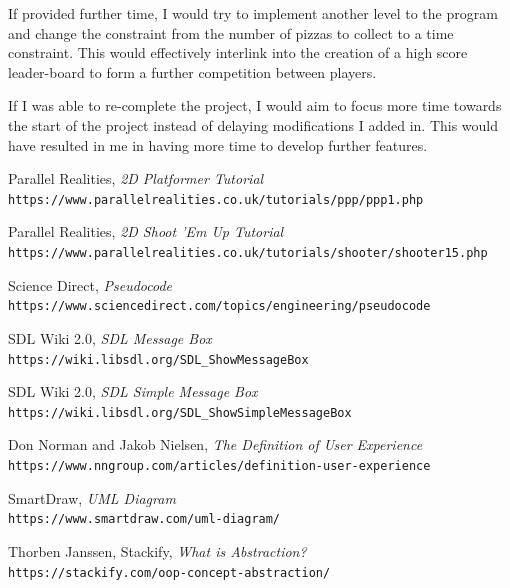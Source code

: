 \documentclass{article}
\begin{document}
If provided further time, I would try to implement another level to the program and change the constraint from the number of pizzas to collect to a time constraint. This would effectively interlink into the creation of a high score leader-board to form a further competition between players.

If I was able to re-complete the project, I would aim to focus more time towards the start of the project instead of delaying modifications I added in. This would have resulted in me in having more time to develop further features.

\cleardoublepage

\begin{thebibliography}{9}
Parallel Realities,
\textit{2D Platformer Tutorial} \\
\texttt{https://www.parallelrealities.co.uk/tutorials/ppp/ppp1.php}

Parallel Realities,
\textit{2D Shoot 'Em Up Tutorial} \\
\texttt{https://www.parallelrealities.co.uk/tutorials/shooter/shooter15.php}

Science Direct,
\textit{Pseudocode} \\
\texttt{https://www.sciencedirect.com/topics/engineering/pseudocode}


SDL Wiki 2.0,
\textit{SDL Message Box} \\
\texttt{https://wiki.libsdl.org/SDL_ShowMessageBox}

SDL Wiki 2.0,
\textit{SDL Simple Message Box} \\
\texttt{https://wiki.libsdl.org/SDL_ShowSimpleMessageBox}


Don Norman and Jakob Nielsen,
\textit{The Definition of User Experience} \\
\texttt{https://www.nngroup.com/articles/definition-user-experience}

SmartDraw,
\textit{UML Diagram } \\
\texttt{https://www.smartdraw.com/uml-diagram/}

Thorben Janssen, Stackify,
\textit{What is Abstraction?} \\
\texttt{https://stackify.com/oop-concept-abstraction/}


\end{thebibliography}
\end{document}
